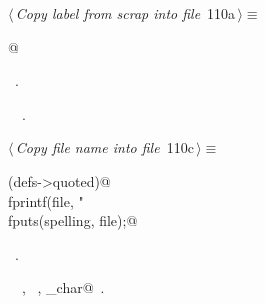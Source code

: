 \documentclass[a4paper]{report}
\begin{document}
\begin{flushleft} \small
\begin{minipage}{\linewidth}\label{scrap232}\raggedright\small
{} $\langle\,${\it Copy label from scrap into file}\nobreak\ {\footnotesize {110a}}$\,\rangle\equiv$
\vspace{-1ex}
\begin{list}{}{} \item
\mbox{}@{\NWsep}
\end{list}
\vspace{-1.5ex}
\footnotesize
\begin{list}{}{\setlength{\itemsep}{-\parsep}\setlength{\itemindent}{-\leftmargin}}
\item \NWtxtMacroRefIn\ .
\item \NWtxtIdentsUsed\nobreak\  \verb@pop@\nobreak\ .
\item{}
\end{list}
\end{minipage}\vspace{4ex}
\end{flushleft}
\begin{flushleft} \small
\begin{minipage}{\linewidth}\label{scrap234}\raggedright\small
{} $\langle\,${\it Copy file name into file}\nobreak\ {\footnotesize {110c}}$\,\rangle\equiv$
\vspace{-1ex}
\begin{list}{}{} \item
\mbox{}\verb@if (defs->quoted)@\\
\mbox{}\verb@   fprintf(file, "%cf", nw_char);@\\
\mbox{}\verb@else@\\
\mbox{}\verb@   fputs(spelling, file);@\\
\mbox{}\verb@@{\NWsep}
\end{list}
\vspace{-1.5ex}
\footnotesize
\begin{list}{}{\setlength{\itemsep}{-\parsep}\setlength{\itemindent}{-\leftmargin}}
\item \NWtxtMacroRefIn\ .
\item \NWtxtIdentsUsed\nobreak\  \verb@fprintf@\nobreak\ , \verb@fputs@\nobreak\ , \verb@nw_char@\nobreak\ .
\item{}
\end{list}
\end{minipage}\vspace{4ex}
\end{flushleft}
\end{document}
